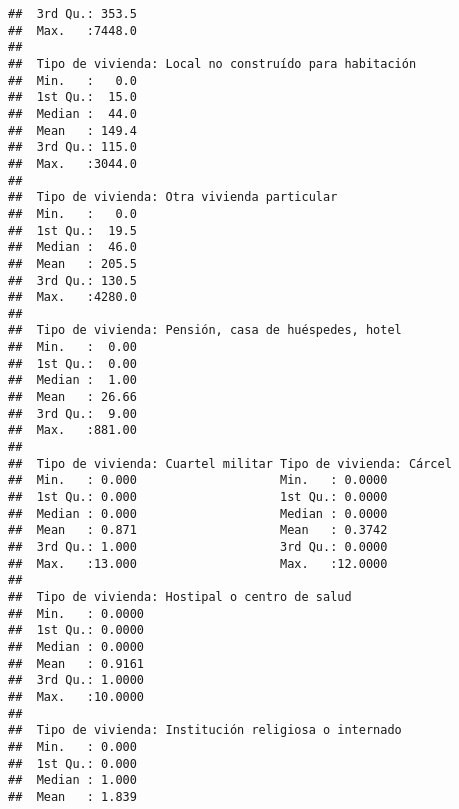 \documentclass[11pt,]{article}
\begin{document}
\begin{verbatim}
##  3rd Qu.: 353.5                                   
##  Max.   :7448.0                                   
##                                                   
##  Tipo de vivienda: Local no construído para habitación
##  Min.   :   0.0                                       
##  1st Qu.:  15.0                                       
##  Median :  44.0                                       
##  Mean   : 149.4                                       
##  3rd Qu.: 115.0                                       
##  Max.   :3044.0                                       
##                                                       
##  Tipo de vivienda: Otra vivienda particular
##  Min.   :   0.0                            
##  1st Qu.:  19.5                            
##  Median :  46.0                            
##  Mean   : 205.5                            
##  3rd Qu.: 130.5                            
##  Max.   :4280.0                            
##                                            
##  Tipo de vivienda: Pensión, casa de huéspedes, hotel
##  Min.   :  0.00                                     
##  1st Qu.:  0.00                                     
##  Median :  1.00                                     
##  Mean   : 26.66                                     
##  3rd Qu.:  9.00                                     
##  Max.   :881.00                                     
##                                                     
##  Tipo de vivienda: Cuartel militar Tipo de vivienda: Cárcel
##  Min.   : 0.000                    Min.   : 0.0000         
##  1st Qu.: 0.000                    1st Qu.: 0.0000         
##  Median : 0.000                    Median : 0.0000         
##  Mean   : 0.871                    Mean   : 0.3742         
##  3rd Qu.: 1.000                    3rd Qu.: 0.0000         
##  Max.   :13.000                    Max.   :12.0000         
##                                                            
##  Tipo de vivienda: Hostipal o centro de salud
##  Min.   : 0.0000                             
##  1st Qu.: 0.0000                             
##  Median : 0.0000                             
##  Mean   : 0.9161                             
##  3rd Qu.: 1.0000                             
##  Max.   :10.0000                             
##                                              
##  Tipo de vivienda: Institución religiosa o internado
##  Min.   : 0.000                                     
##  1st Qu.: 0.000                                     
##  Median : 1.000                                     
##  Mean   : 1.839                                     

\end{verbatim}
\end{document}
